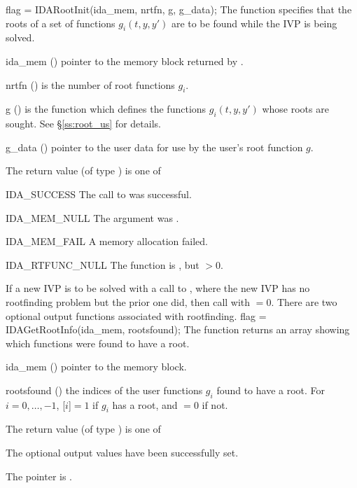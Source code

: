 {
  flag = IDARootInit(ida\_mem, nrtfn, g, g\_data);
}
{
  The function  specifies that the roots of a set of
  functions $g_i(t,y,y')$ are to be found while the IVP is being solved.
}
{
  \begin{args}
  \item[ida\_mem] ()
    pointer to the {\ida} memory block returned by .
  \item[nrtfn] ()
    is the number of root functions $g_i$.
  \item[g] ()
    is the {\C} function which defines the  functions $g_i(t,y,y')$
    whose roots are sought. See \S\ref{ss:root_us} for details.
  \item[g\_data] ()
    pointer to the user data for use by the user's root function $g$.
 \end{args}
}
{
  The return value  (of type ) is one of
  \begin{args}
  \item[IDA\_SUCCESS]
    The call to  was successful.
  \item[IDA\_MEM\_NULL]
    The  argument was .
  \item[IDA\_MEM\_FAIL]
    A memory allocation failed.
  \item[IDA\_RTFUNC\_NULL]
    The function  is , but $>0$.
  \end{args}
}
{
  If a new IVP is to be solved with a call to , where the new
  IVP has no rootfinding problem but the prior one did, then call
   with $=0$.
}
There are two optional output functions associated with rootfinding.
{
  flag = IDAGetRootInfo(ida\_mem, rootsfound);
}
{
  The function  returns an array showing which 
  functions were found to have a root.
}
{
  \begin{args}
  \item[ida\_mem] ()
    pointer to the {\ida} memory block.
  \item[rootsfound] ()
    the indices of the user functions $g_i$ found to have a root.  For
    $i=0,\ldots,$$-1$, [$i$]$=1$ if $g_i$
    has a root, and $=0$ if not.
  \end{args}
}
{
  The return value  (of type ) is one of
  \begin{args}
  \item[\Id{IDA\_SUCCESS}] 
    The optional output values have been successfully set.
  \item[\Id{IDA\_MEM\_NULL}]
    The  pointer is .
  \end{args}
}

